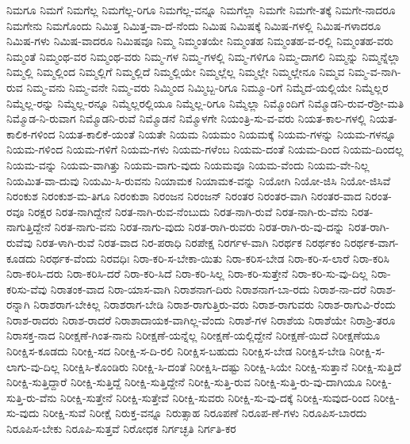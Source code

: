 {ನಿಮಗೂ
ನಿಮಗೆ
ನಿಮಗೆಲ್ಲ
ನಿಮಗೆಲ್ಲ-ರಿಗೂ
ನಿಮಗೆಲ್ಲ-ವನ್ನೂ
ನಿಮಗೆಲ್ಲಾ
ನಿಮಗೇ
ನಿಮಗೇ-ತಕ್ಕೆ
ನಿಮಗೇ-ನಾದರೂ
ನಿಮಗೇನು
ನಿಮಗೊಂದು
ನಿಮಿತ್ತ
ನಿಮಿತ್ತ-ವಾ-ದೆ-ನೆಂದು
ನಿಮಿಷ
ನಿಮಿಷಕ್ಕೆ
ನಿಮಿಷ-ಗಳಲ್ಲಿ
ನಿಮಿಷ-ಗಳಾದರೂ
ನಿಮಿಷ-ಗಳು
ನಿಮಿಷ-ವಾದರೂ
ನಿಮಿಷವೂ
ನಿಮ್ಮ
ನಿಮ್ಮಂತಯೇ
ನಿಮ್ಮಂತಹ
ನಿಮ್ಮಂತಹ-ವ-ರಲ್ಲಿ
ನಿಮ್ಮಂತಹ-ವರು
ನಿಮ್ಮಂತೆ
ನಿಮ್ಮಂಥ-ವರ
ನಿಮ್ಮಂಥ-ವರು
ನಿಮ್ಮ-ಗಳ
ನಿಮ್ಮ-ಗಳಲ್ಲಿ
ನಿಮ್ಮ-ಗಳಿಗೂ
ನಿಮ್ಮ-ದಾಗಲಿ
ನಿಮ್ಮನ್ನು
ನಿಮ್ಮನ್ನೆಲ್ಲಾ
ನಿಮ್ಮಲ್ಲಿ
ನಿಮ್ಮಲ್ಲಿಂದ
ನಿಮ್ಮಲ್ಲಿಗೆ
ನಿಮ್ಮಲ್ಲಿದೆ
ನಿಮ್ಮಲ್ಲಿಯೇ
ನಿಮ್ಮಲ್ಲೆಲ್ಲ
ನಿಮ್ಮಲ್ಲೇ
ನಿಮ್ಮಲ್ಲೇನೂ
ನಿಮ್ಮವ
ನಿಮ್ಮ-ವ-ನಾಗಿ-ರುವ
ನಿಮ್ಮ-ವನು
ನಿಮ್ಮ-ವನೇ
ನಿಮ್ಮ-ವರು
ನಿಮ್ಮಿಂದ
ನಿಮ್ಮಿಬ್ಬ-ರಿಗೂ
ನಿಮ್ಮೂ-ರಿಗೆ
ನಿಮ್ಮೆದೆ-ಯಲ್ಲಿಯೇ
ನಿಮ್ಮೆಲ್ಲರ
ನಿಮ್ಮೆಲ್ಲ-ರನ್ನು
ನಿಮ್ಮೆಲ್ಲ-ರನ್ನೂ
ನಿಮ್ಮೆಲ್ಲರಲ್ಲಿಯೂ
ನಿಮ್ಮೆಲ್ಲ-ರಿಗೂ
ನಿಮ್ಮೆಲ್ಲಾ
ನಿಮ್ಮೊಂದಿಗೆ
ನಿಮ್ಮೊಡನಿ-ರುವ-ರೆಶ್ರೀ-ಮತಿ
ನಿಮ್ಮೊಡ-ನಿ-ರುವಾಗ
ನಿಮ್ಮೊಡನಿ-ರುವೆ
ನಿಮ್ಮೊಡನೆ
ನಿಮ್ಮೊಳಗೇ
ನಿಯಂತ್ರಿ-ಸು-ವ-ವರು
ನಿಯತ-ಕಾಲ-ಗಳಲ್ಲಿ
ನಿಯತ-ಕಾಲಿಕ-ಗಳಿಂದ
ನಿಯತ-ಕಾಲಿಕೆ-ಯಂತೆ
ನಿಯತೇ
ನಿಯಮ
ನಿಯಮಂ
ನಿಯಮಕ್ಕೆ
ನಿಯಮ-ಗಳನ್ನು
ನಿಯಮ-ಗಳನ್ನೂ
ನಿಯಮ-ಗಳಿಂದ
ನಿಯಮ-ಗಳಿಗೆ
ನಿಯಮ-ಗಳು
ನಿಯಮ-ಗಳೆಂಬ
ನಿಯಮ-ದಂತೆ
ನಿಯಮ-ದಿಂದ
ನಿಯಮ-ದಿಂದಲ್ಲ
ನಿಯಮ-ವನ್ನು
ನಿಯಮ-ವಾಗಿತ್ತು
ನಿಯಮ-ವಾಗು-ವುದು
ನಿಯಮವೂ
ನಿಯಮ-ವೆಂದು
ನಿಯಮ-ವೇ-ನಿಲ್ಲ
ನಿಯಮಿತ-ವಾ-ದುವು
ನಿಯಮಿ-ಸಿ-ರುವನು
ನಿಯಾಮಕ
ನಿಯಾಮಕ-ವನ್ನು
ನಿಯೋಗಿ
ನಿಯೋ-ಜಿಸಿ
ನಿಯೋ-ಜಿಸಿವೆ
ನಿರಂಕುಶ
ನಿರಂಕುಶ-ಮ-ತಿಗೂ
ನಿರಂಕುಶಾ
ನಿರಂಜನ
ನಿರಂಜನ್
ನಿರಂತರ
ನಿರಂತರ-ವಾಗಿ
ನಿರಂತರ-ವಾದ
ನಿರಂತ-ರವೂ
ನಿರಕ್ಷರ
ನಿರತ-ನಾಗಿದ್ದೇನೆ
ನಿರತ-ನಾಗಿ-ರುವ-ನೆಂಬುದು
ನಿರತ-ನಾಗಿ-ರುವೆ
ನಿರತ-ನಾಗಿ-ರು-ವೆನು
ನಿರತ-ನಾಗುತ್ತಿದ್ದೇನೆ
ನಿರತ-ನಾಗು-ವನು
ನಿರತ-ನಾಗು-ವುದು
ನಿರತ-ರಾಗಿ-ರುವರು
ನಿರತ-ರಾಗಿ-ರು-ವು-ದನ್ನು
ನಿರತ-ರಾಗಿ-ರುವೆವು
ನಿರತ-ಳಾಗಿ-ರುವೆ
ನಿರತ-ವಾದ
ನಿರ-ಪರಾಧಿ
ನಿರಪೇಕ್ಷ
ನಿರರ್ಗಳ-ವಾಗಿ
ನಿರರ್ಥಕ
ನಿರರ್ಥಕಂ
ನಿರರ್ಥಕ-ವಾಗ-ಕೂಡದು
ನಿರರ್ಥಕ-ವೆಂದು
ನಿರವಧಿಃ
ನಿರಾ-ಕರಿ-ಸ-ಬೇಕಾ-ಯಿತು
ನಿರಾ-ಕರಿಸ-ಬೇಡ
ನಿರಾ-ಕರಿ-ಸ-ಲಾರೆ
ನಿರಾ-ಕರಿಸಿ
ನಿರಾ-ಕರಿಸಿ-ದರು
ನಿರಾ-ಕರಿಸಿ-ದರೆ
ನಿರಾ-ಕರಿ-ಸಿದೆ
ನಿರಾ-ಕರಿ-ಸಿಲ್ಲ
ನಿರಾ-ಕರಿ-ಸುತ್ತೇನೆ
ನಿರಾ-ಕರಿ-ಸು-ವು-ದಿಲ್ಲ
ನಿರಾ-ಕರಿಸು-ವೆವು
ನಿರಾತಂಕ-ವಾದ
ನಿರಾ-ಯಾಸ-ವಾಗಿ
ನಿರಾಶನಾಗ-ದಿರು
ನಿರಾಶನಾಗ-ಬಾ-ರದು
ನಿರಾಶ-ನಾ-ದರೆ
ನಿರಾಶ-ರನ್ನಾಗಿ
ನಿರಾಶರಾಗ-ಬೇಕಿಲ್ಲ
ನಿರಾಶರಾಗ-ಬೇಡಿ
ನಿರಾಶ-ರಾಗುತ್ತಿರು-ವರು
ನಿರಾಶ-ರಾಗುವರು
ನಿರಾಶ-ರಾಗುವಿ-ರೆಂದು
ನಿರಾಶ-ರಾದರು
ನಿರಾಶ-ರಾದರೆ
ನಿರಾಶಾದಾಯಕ-ವಾಗಿಲ್ಲ-ವೆಂದು
ನಿರಾಶೆ-ಗಳ
ನಿರಾಶೆಯ
ನಿರಾಶೆಯೇ
ನಿರಾಶ್ರಿ-ತರೂ
ನಿರಾಸಕ್ತ-ನಾದ
ನಿರೀಕ್ಷಣೆ-ಗಿಂತ-ನಾನು
ನಿರೀಕ್ಷಣೆ-ಯನ್ನೆಲ್ಲ
ನಿರೀಕ್ಷಣೆ-ಯಲ್ಲಿದ್ದೇನೆ
ನಿರೀಕ್ಷಣೆ-ಯಿದೆ
ನಿರೀಕ್ಷಣೆಯೂ
ನಿರೀಕ್ಷಿಸ-ಕೂಡದು
ನಿರೀಕ್ಷಿ-ಸದ
ನಿರೀಕ್ಷಿ-ಸ-ದಿ-ರಲಿ
ನಿರೀಕ್ಷಿಸ-ಬಹುದು
ನಿರೀಕ್ಷಿಸ-ಬೇಡ
ನಿರೀಕ್ಷಿಸ-ಬೇಡಿ
ನಿರೀಕ್ಷಿ-ಸ-ಲಾಗು-ವು-ದಿಲ್ಲ
ನಿರೀಕ್ಷಿಸಿ-ಕೊಂಡಿರು
ನಿರೀಕ್ಷಿ-ಸಿ-ದಂತೆ
ನಿರೀಕ್ಷಿಸಿ-ದಷ್ಟು
ನಿರೀಕ್ಷಿ-ಸಿಯೇ
ನಿರೀಕ್ಷಿ-ಸುತ್ತಾನೆ
ನಿರೀಕ್ಷಿ-ಸುತ್ತಿದೆ
ನಿರೀಕ್ಷಿ-ಸುತ್ತಿದ್ದಾರೆ
ನಿರೀಕ್ಷಿ-ಸುತ್ತಿದ್ದೆ
ನಿರೀಕ್ಷಿ-ಸುತ್ತಿದ್ದೇನೆ
ನಿರೀಕ್ಷಿ-ಸುತ್ತಿ-ರುವ
ನಿರೀಕ್ಷಿ-ಸುತ್ತಿ-ರು-ವು-ದಾಗಿಯೂ
ನಿರೀಕ್ಷಿ-ಸುತ್ತಿ-ರು-ವೆನು
ನಿರೀಕ್ಷಿ-ಸುತ್ತೇನೆ
ನಿರೀಕ್ಷಿ-ಸುತ್ತೇವೆ
ನಿರೀಕ್ಷಿ-ಸುವರು
ನಿರೀಕ್ಷಿ-ಸು-ವು-ದಕ್ಕೆ
ನಿರೀಕ್ಷಿ-ಸುವುದ-ರಿಂದ
ನಿರೀಕ್ಷಿ-ಸು-ವುದು
ನಿರೀಕ್ಷಿ-ಸುವೆ
ನಿರೀಕ್ಷೆ
ನಿರುಕ್ತ-ವನ್ನೂ
ನಿರುತ್ಸಾಹ
ನಿರೂಪಣೆ
ನಿರೂಪ-ಣೆ-ಗಳು
ನಿರೂಪಿಸ-ಬಾರದು
ನಿರೂಪಿಸ-ಬೇಕು
ನಿರೂಪಿ-ಸುತ್ತವೆ
ನಿರೋಧಕ
ನಿರ್ಗಚ್ಛತಿ
ನಿರ್ಗತಿ-ಕರ
}
